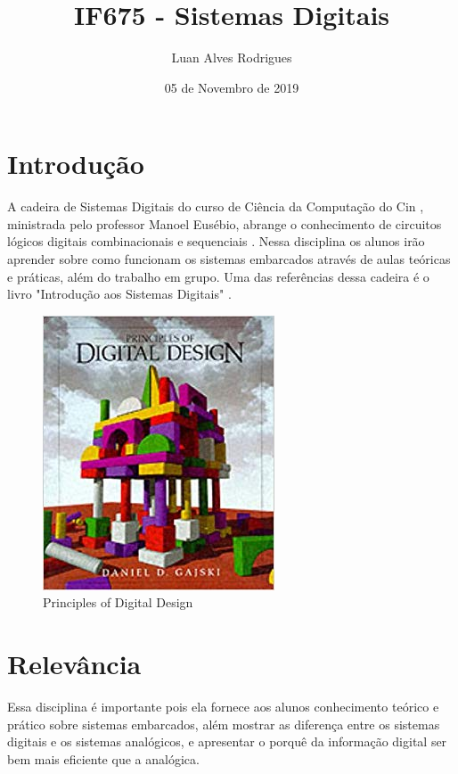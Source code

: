 \documentclass[a4paper,10pt]{extarticle}
\title{IF675 - Sistemas Digitais}
\author{Luan Alves Rodrigues }
\date{05 de Novembro de 2019}
\begin{document}
\maketitle

\section{Introdução}
A cadeira de Sistemas Digitais do curso de Ciência da Computação do Cin , ministrada pelo professor Manoel Eusébio, abrange o conhecimento de circuitos lógicos digitais combinacionais e sequenciais \citep{sistemas}. Nessa disciplina os alunos irão aprender sobre como funcionam os sistemas embarcados através de aulas teóricas e práticas\citep{SiteDisciplina}, além do trabalho em grupo. Uma das referências dessa cadeira é o livro "Introdução aos Sistemas Digitais" \citep{Livro}.

\begin{figure}[h!]
\centering
\includegraphics[scale=0.7]{1}
\caption{Principles of Digital Design\citep{Imagem}}
\label{fig:1}
\end{figure}


\section{Relevância}
Essa disciplina é importante pois ela fornece aos alunos conhecimento teórico e prático sobre sistemas embarcados, além mostrar as diferença entre os sistemas digitais e os sistemas analógicos, e apresentar o porquê da informação digital ser bem mais eficiente que a analógica.
\end{document}
